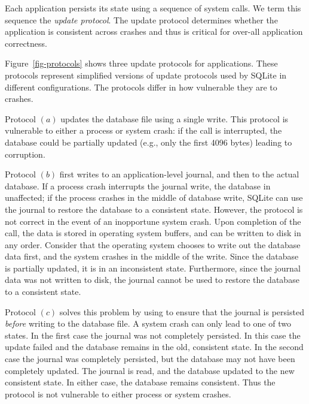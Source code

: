 Each application persists its state using a sequence of system calls. We term
this sequence the \textit{update protocol}. The update protocol determines
whether the application is consistent across crashes and thus is critical for
over-all application correctness.     

Figure~\ref{fig-protocols} shows three update protocols for applications. These
protocols represent simplified versions of update protocols used by SQLite in
different configurations. The protocols differ in how vulnerable they are to
crashes. 


Protocol $(a)$ updates the database file using a single write. This protocol is
vulnerable to either a process or system crash: if the  call
is interrupted, the database could be partially updated (e.g., only the first
4096 bytes) leading to corruption.   

Protocol $(b)$ first writes to an application-level journal, and then to the
actual database. If a process crash interrupts the journal write, the database
in unaffected; if the process crashes in the middle of database write, SQLite
can use the journal to restore the database to a consistent state. However,
the protocol is not correct in the event of an inopportune system crash. Upon
completion of the  call, the data is stored in operating
system buffers, and can be written to disk in any order. Consider that the
operating system chooses to write out the database data first, and the system
crashes in the middle of the write. Since the database is partially updated, it
is in an inconsistent state. Furthermore, since the journal data was not
written to disk, the journal cannot be used to restore the database to a
consistent state.

Protocol $(c)$ solves this problem by using  to ensure that
the journal is persisted \textit{before} writing to the database file. A system
crash can only lead to one of two states. In the first case the journal was not
completely persisted.  In this case the update failed and the database remains
in the old, consistent state. In the second case the journal was completely
persisted, but the database may not have been completely updated.  The
journal is read, and the database updated to the new consistent state.
In either case, the database remains consistent. Thus the protocol is not
vulnerable to either process or system crashes.  

